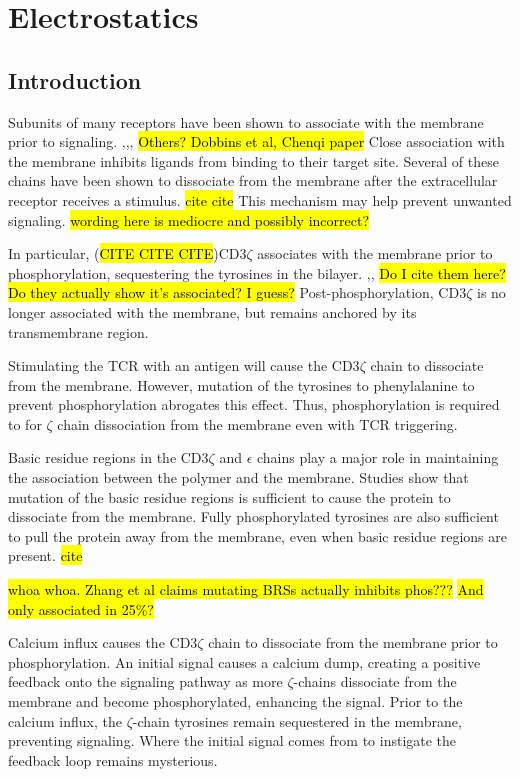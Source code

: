 \documentclass[../../AdvancementSummary.tex]{subfiles}
\begin{document}
\section{Electrostatics}

\subsection{Introduction}

Subunits of many receptors have been shown to associate with the membrane prior to signaling. \cite{Xu2008},\cite{Shi2013},\cite{Zhang2011},\cite{Dobbins2016} \hl{Others?  Dobbins et al, Chenqi paper} Close association with the membrane inhibits ligands from binding to their target site. Several of these chains have been shown to dissociate from the membrane after the extracellular receptor receives a stimulus. \hl{cite cite} This mechanism may help prevent unwanted signaling. \hl{wording here is mediocre and possibly incorrect?}

In particular, (\hl{CITE CITE CITE})CD3$\zeta$ associates with the membrane prior to phosphorylation, sequestering the tyrosines in the bilayer. \cite{Aivazian2000},\cite{Zhang2011},\cite{Shi2013} \hl{Do I cite them here? Do they actually show it's associated?  I guess?} Post-phosphorylation, CD3$\zeta$ is no longer associated with the membrane, but remains anchored by its transmembrane region. \cite{Aivazian2000}

Stimulating the TCR with an antigen will cause the CD3$\zeta$ chain to dissociate from the membrane. However, mutation of the tyrosines to phenylalanine to prevent phosphorylation abrogates this effect. Thus, phosphorylation is required to for $\zeta$ chain dissociation from the membrane even with TCR triggering. \cite{Zhang2011}

Basic residue regions in the CD3$\zeta$ and $\epsilon$ chains play a major role in maintaining the association between the polymer and the membrane. Studies show that mutation of the basic residue regions is sufficient to cause the protein to dissociate from the membrane.\cite{Zhang2011} Fully phosphorylated tyrosines are also sufficient to pull the protein away from the membrane, even when basic residue regions are present. \hl{cite} 

\hl{whoa whoa. Zhang et al claims mutating BRSs actually inhibits phos???}
\hl{And only associated in 25\%?}

Calcium influx causes the CD3$\zeta$ chain to dissociate from the membrane prior to phosphorylation. An initial signal causes a calcium dump, creating a positive feedback onto the signaling pathway as more $\zeta$-chains dissociate from the membrane and become phosphorylated, enhancing the signal.  \cite{Shi2013} Prior to the calcium influx, the $\zeta$-chain tyrosines remain sequestered in the membrane, preventing signaling. Where the initial signal comes from to instigate the feedback loop remains mysterious.
\end{document}
